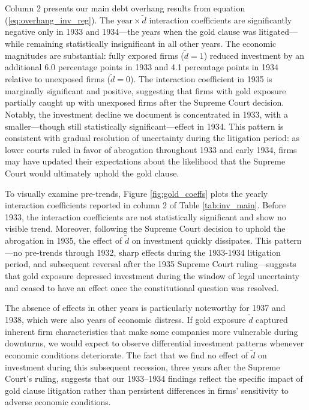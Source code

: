 Column 2 presents our main debt overhang results from equation (\ref{eq:overhang_inv_reg}). The $\text{year}\times\tilde{d}$ interaction coefficients are significantly negative only in 1933 and 1934---the years when the gold clause was litigated---while remaining statistically insignificant in all other years. The economic magnitudes are substantial: fully exposed firms ($\tilde{d}=1$) reduced investment by an additional 6.0 percentage points in 1933 and 4.1 percentage points in 1934 relative to unexposed firms ($\tilde{d}=0$). The interaction coefficient in 1935 is marginally significant and positive, suggesting that firms with gold exposure partially caught up with unexposed firms after the Supreme Court decision. Notably, the investment decline we document is concentrated in 1933, with a smaller---though still statistically significant---effect in 1934. This pattern is consistent with gradual resolution of uncertainty during the litigation period: as lower courts ruled in favor of abrogation throughout 1933 and early 1934, firms may have updated their expectations about the likelihood that the Supreme Court would ultimately uphold the gold clause.

To visually examine pre-trends, Figure \ref{fig:gold_coeffs} plots the yearly interaction coefficients reported in column 2 of Table \ref{tab:inv_main}. Before 1933, the interaction coefficients are not statistically significant and show no visible trend. Moreover, following the Supreme Court decision to uphold the abrogation in 1935, the effect of $\tilde{d}$ on investment quickly dissipates. This pattern---no pre-trends through 1932, sharp effects during the 1933-1934 litigation period, and subsequent reversal after the 1935 Supreme Court ruling---suggests that gold exposure depressed investment during the window of legal uncertainty and ceased to have an effect once the constitutional question was resolved.

The absence of effects in other years is particularly noteworthy for 1937 and 1938, which were also years of economic distress. If gold exposure $\tilde{d}$ captured inherent firm characteristics that make some companies more vulnerable during downturns, we would expect to observe differential investment patterns whenever economic conditions deteriorate. The fact that we find no effect of $\tilde{d}$ on investment during this subsequent recession, three years after the Supreme Court's ruling, suggests that our 1933--1934 findings reflect the specific impact of gold clause litigation rather than persistent differences in firms' sensitivity to adverse economic conditions.

